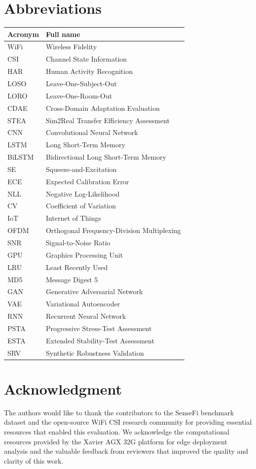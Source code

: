 \documentclass[journal]{IEEEtran}
\begin{document}
\section*{Abbreviations}
\begin{table}[h]
\centering
\begin{tabular}{@{}ll@{}}
\toprule
\textbf{Acronym} & \textbf{Full name} \\
\midrule
WiFi & Wireless Fidelity \\
CSI & Channel State Information \\
HAR & Human Activity Recognition \\
LOSO & Leave-One-Subject-Out \\
LORO & Leave-One-Room-Out \\
CDAE & Cross-Domain Adaptation Evaluation \\
STEA & Sim2Real Transfer Efficiency Assessment \\
CNN & Convolutional Neural Network \\
LSTM & Long Short-Term Memory \\
BiLSTM & Bidirectional Long Short-Term Memory \\
SE & Squeeze-and-Excitation \\
ECE & Expected Calibration Error \\
NLL & Negative Log-Likelihood \\
CV & Coefficient of Variation \\
IoT & Internet of Things \\
OFDM & Orthogonal Frequency-Division Multiplexing \\
SNR & Signal-to-Noise Ratio \\
GPU & Graphics Processing Unit \\
LRU & Least Recently Used \\
MD5 & Message Digest 5 \\
GAN & Generative Adversarial Network \\
VAE & Variational Autoencoder \\
RNN & Recurrent Neural Network \\
PSTA & Progressive Stress-Test Assessment \\
ESTA & Extended Stability-Test Assessment \\
SRV & Synthetic Robustness Validation \\
\bottomrule
\end{tabular}
\end{table}

\section*{Acknowledgment}

The authors would like to thank the contributors to the SenseFi benchmark dataset and the open-source WiFi CSI research community for providing essential resources that enabled this evaluation. We acknowledge the computational resources provided by the Xavier AGX 32G platform for edge deployment analysis and the valuable feedback from reviewers that improved the quality and clarity of this work.



\end{document}
